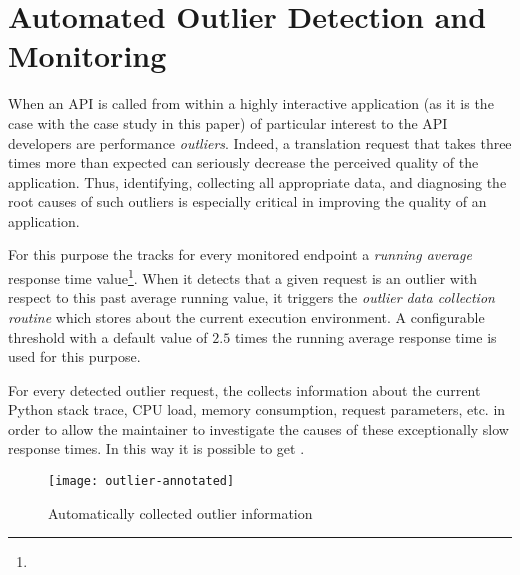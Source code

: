   \section{Automated Outlier Detection and Monitoring}
  \label{sec:outliers}
  
  When an API is called from within a highly interactive application (as it is the case with the case study in this paper) 
  of particular interest to the API developers are performance {\em outliers}.   Indeed, a translation request that takes three times more than expected can seriously decrease the perceived quality of the application. Thus, identifying, collecting all appropriate data, and diagnosing the root causes of such outliers is especially critical in improving the quality of an application. 
  
  
  For this purpose the \tool tracks for every monitored endpoint a {\em running average} response time value\footnote{}. When it detects that a given request is an outlier with respect to this past average running value, it triggers the {\em outlier data collection routine} which stores  about the current execution environment. A configurable threshold with a default value of $2.5$ times the running average response time is used for this purpose. 

  For every detected outlier request, the \tool collects information about the current Python stack trace, CPU load, memory consumption, request parameters, etc. in order to allow the maintainer to investigate the causes of these exceptionally slow response times. In this way it is possible to get .


  \begin{figure}[h!]
    \centering
    \texttt{[image: outlier-annotated]}
    \caption{Automatically collected outlier information}
    \label{fig:stack}
  \end{figure}
  

